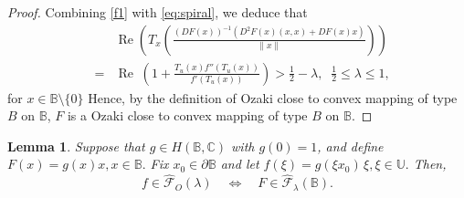 \documentclass[11pt, reqno]{amsart}
\newtheorem{lem}{Lemma}[section]
\numberwithin{equation}{section}
\newcommand{\beas}{\begin{eqnarray*}}
\newcommand{\eeas}{\end{eqnarray*}}
\begin{document}
\begin{proof}
Combining \eqref{f1} with \eqref{eq:spiral}, we deduce that
\beas
&&\operatorname{Re}\left(T_x\!\left(\frac{(DF(x))^{-1}\left(D^2F(x)(x,x)+DF(x)x\right)}{\|x\|}\right)\right)\\
&=&\operatorname{Re}\;\left(1+\frac{T_u(x)f''(T_u(x))}{f'(T_u(x))}\right)>\frac{1}{2}-\lambda,\;\;\frac{1}{2}\leq \lambda\leq 1,
\eeas
for $x\in \mathbb{B}\setminus\{0\}$ Hence, by the definition of Ozaki close to convex mapping of type \(B\) on \(\mathbb{B}\), $F$ is a Ozaki close to convex mapping of type \(B\) on \(\mathbb{B}\).
\end{proof}


\begin{lem}\label{L2}
Suppose that $g\in H(\mathbb{B},\mathbb{C})$ with $g(0)=1$, and define $F(x)=g(x)x, x\in\mathbb{B}.$ Fix $x_{0}\in\partial\mathbb{B}$ and let
$f(\xi)=g(\xi x_{0})\,\xi,\xi\in\mathbb{U}.$
Then,
\[
f\in\widehat{\mathcal{F}}_{O}(\lambda)
\quad\Longleftrightarrow\quad
F\in\widehat{\mathcal{F}}_{\lambda}(\mathbb{B}).
\]
\end{lem}
\end{document}
